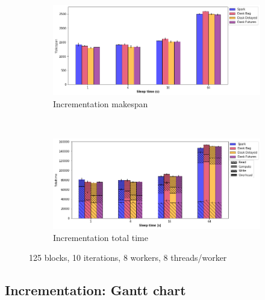 \documentclass[conference]{IEEEtran}
\begin{document}
\begin{figure}[!t]
    \centering
    \begin{subfigure}[b]{\columnwidth}
        \includegraphics[clip,width=\columnwidth]{images/inc_sleep.png}%
        \caption{Incrementation makespan}\label{fig:inc_ms_sleep}
    \end{subfigure}
    \\
    \begin{subfigure}[b]{\columnwidth}
        \includegraphics[clip,width=\columnwidth]{images/inc_idle_sleep.png}%
        \caption{Incrementation total time}\label{fig:inc_tt_sleep}
    \end{subfigure}
    \caption{125 blocks, 10 iterations, 8 workers, 8 threads/worker}
\end{figure}

\subsection{Incrementation: Gantt chart}
\end{document}
